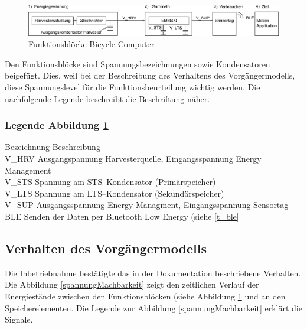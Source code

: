 \begin{figure}[ht]
   \includegraphics[width=1\textwidth]{3Vorgehen/imag/Blockdiagramm.png}
   \caption{Funktionsblöcke Bicycle Computer}
   \label{funktionsdiagramm_bild} 
\end{figure}

Den Funktionsblöcke sind Spannungsbezeichnungen sowie Kondensatoren beigefügt. Dies, weil bei der Beschreibung des Verhaltens des Vorgängermodells, diese Spannungslevel für die Funktionsbeurteilung wichtig werden. Die nachfolgende Legende beschreibt die Beschriftung näher.

\subsubsection*{Legende Abbildung \ref{funktionsdiagramm_bild}}
\label{legende}

\begin{tabbing}
    Bezeichnung \quad\= Beschreibung\\[0.8ex]
    V\_HRV \> Ausgangspannung Harvesterquelle, Eingangsspannung Energy Management\\
    V\_STS\> Spannung am STS--Kondensator (Primärspeicher)\\
    V\_LTS\> Spannung am LTS--Kondensator (Sekundärspeicher)\\
    V\_SUP\> Ausgangsspannung Energy Managment, Eingangsspannung Sensortag\\
    BLE \> Senden der Daten per Bluetooth Low Energy (siehe \ref{t_ble} \\
\end{tabbing}   


\subsection{Verhalten des Vorgängermodells}\label{verhalten} 

Die Inbetriebnahme bestätigte das in der Dokumentation \cite{PA_bicycle} beschriebene Verhalten. Die Abbildung \ref{spannungMachbarkeit} zeigt den zeitlichen Verlauf der Energiestände zwischen den Funktionsblöcken (siehe Abbildung \ref{funktionsdiagramm_bild} und an den Speicherelementen. Die Legende zur Abbildung  \ref{spannungMachbarkeit} erklärt die Signale.

